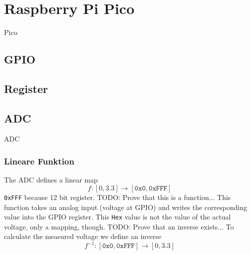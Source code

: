 \section{Raspberry Pi Pico}

Pico

\subsection{GPIO}


\subsection{Register}


\subsection{ADC}

ADC

\subsubsection{Lineare Funktion}
The ADC defines a linear map 
$$f: [0,3.3] \rightarrow [\texttt{0x0}, \texttt{0xFFF}]$$ \newline
\texttt{0xFFF} because 12 bit register. \newline
TODO: Prove that this is a function... \newline
This function takes an analog input (voltage at GPIO) and writes the corresponding value into the GPIO register. \newline
This \texttt{Hex} value is not the value of the actual voltage, only a mapping, though.
TODO: Prove that an inverse exists... \newline
To calculate the measured voltage we define an inverse
$$
	f^{-1}: [\texttt{0x0}, \texttt{0xFFF}] \rightarrow [0, 3.3]
$$
